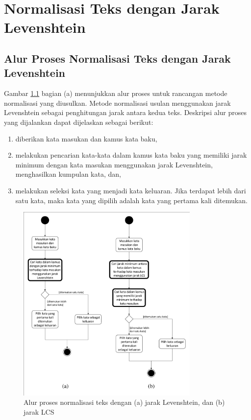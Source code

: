 \chapter{Normalisasi Teks dengan Jarak Levenshtein}

\section{Alur Proses Normalisasi Teks dengan Jarak Levenshtein}

Gambar \ref{fig:side_to_side} bagian (a) menunjukkan alur proses untuk rancangan metode normalisasi yang diusulkan. Metode normalisasi usulan menggunakan jarak Levenshtein sebagai penghitungan jarak antara kedua teks. Deskripsi alur proses yang dijalankan dapat dijelaskan sebagai berikut:
\begin{enumerate}
	\item diberikan kata masukan dan kamus kata baku,
	\item melakukan pencarian kata-kata dalam kamus kata baku yang memiliki jarak minimum dengan kata masukan menggunakan jarak Levenshtein, menghasilkan kumpulan kata, dan,
	\item melakukan seleksi kata yang menjadi kata keluaran. Jika terdapat lebih dari satu kata, maka kata yang dipilih adalah kata yang pertama kali ditemukan.
\end{enumerate}
\begin{figure}[ht]
	\centering
	\includegraphics[width=0.8\textwidth, trim=2 2 2 2, clip]{resources/3/side_to_side.pdf}
	\caption{Alur proses normalisasi teks dengan (a) jarak Levenshtein, dan (b) jarak LCS \parencite{saragih2017normalisasi}}
	\label{fig:side_to_side}
\end{figure}

